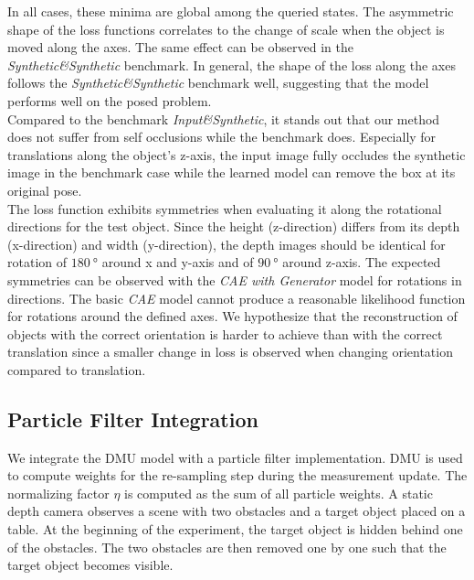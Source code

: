 \documentclass[letterpaper, 10 pt, journal, twoside]{ieeetran}  %
\begin{document}
In all cases, these minima are global among the queried states. 
The asymmetric shape of the loss functions correlates to the change of scale when the object is moved along the axes.
The same effect can be observed in the \textit{Synthetic\&Synthetic} benchmark.
In general, the shape of the loss along the axes follows the \textit{Synthetic\&Synthetic} benchmark well, suggesting that the model performs well on the posed problem.\\
Compared to the benchmark \textit{Input\&Synthetic}, it stands out that our method does not suffer from self occlusions while the benchmark does. Especially for translations along the object's z-axis, the input image fully occludes the synthetic image in the benchmark case while the learned model can remove the box at its original pose.\\
The loss function exhibits symmetries when evaluating it along the rotational directions for the test object. Since the height (z-direction) differs from its depth (x-direction) and width (y-direction), the depth images should be identical for rotation of $\SI{180}{\degree}$ around x and y-axis and of $\SI{90}{\degree}$  around z-axis.
The expected symmetries can be observed with the \textit{CAE with Generator} model for rotations in directions.
The basic \textit{CAE} model cannot produce a reasonable likelihood function for rotations around the defined axes.
We hypothesize that the reconstruction of objects with the correct orientation is harder to achieve than with the correct translation since a smaller change in loss is observed when changing orientation compared to translation.
\subsection{Particle Filter Integration}
\label{subsec:particle_filter_integration}
We integrate the DMU model with a particle filter implementation.
DMU is used to compute weights for the re-sampling step during the measurement update. The normalizing factor $\eta$ is computed as the sum of all particle weights.
A static depth camera observes a scene with two obstacles and a target object placed on a table. At the beginning of the experiment, the target object is hidden behind one of the obstacles. The two obstacles are then removed one by one such that the target object becomes visible.
\end{document}
